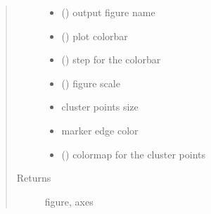 \documentclass[letterpaper,10pt,english]{sphinxmanual}
\begin{document}
\begin{fulllineitems}
\begin{fulllineitems}
\begin{quote}
\begin{description}
\begin{itemize}
\item {} 
\sphinxAtStartPar
{} () \textendash{} output figure name

\item {} 
\sphinxAtStartPar
{} () \textendash{} plot colorbar

\item {} 
\sphinxAtStartPar
{} () \textendash{} step for the colorbar

\item {} 
\sphinxAtStartPar
{} () \textendash{} figure scale

\item {} 
\sphinxAtStartPar
{} \textendash{} cluster points size

\item {} 
\sphinxAtStartPar
{} \textendash{} marker edge color

\item {} 
\sphinxAtStartPar
{} () \textendash{} colormap for the cluster points

\end{itemize}

\item[{Returns}] \leavevmode
\sphinxAtStartPar
figure, axes

\end{description}\end{quote}

\end{fulllineitems}



\end{fulllineitems}
\end{document}
